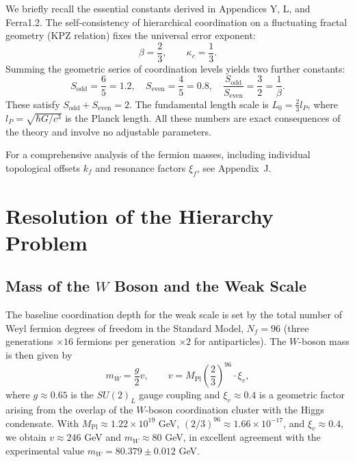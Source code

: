\documentclass[12pt,a4paper]{article}
\begin{document}
	We briefly recall the essential constants derived in Appendices Y, L, and Ferra1.2. The self‑consistency of hierarchical coordination on a fluctuating fractal geometry (KPZ relation) fixes the universal error exponent:
	\begin{equation}
		\beta = \frac{2}{3}, \qquad \kappa_c = \frac{1}{3}.
	\end{equation}
	Summing the geometric series of coordination levels yields two further constants:
	\begin{equation}
		S_{\mathrm{odd}} = \frac{6}{5} = 1.2, \quad S_{\mathrm{even}} = \frac{4}{5} = 0.8, \quad \frac{S_{\mathrm{odd}}}{S_{\mathrm{even}}} = \frac{3}{2} = \frac{1}{\beta}.
	\end{equation}
	These satisfy $S_{\mathrm{odd}} + S_{\mathrm{even}} = 2$. The fundamental length scale is $L_0 = \frac{2}{3} l_P$, where $l_P = \sqrt{\hbar G / c^3}$ is the Planck length. All these numbers are exact consequences of the theory and involve no adjustable parameters.
	
	For a comprehensive analysis of the fermion masses, including individual topological offsets $k_f$ and resonance factors $\xi_f$, see Appendix~J.
	
	\section{Resolution of the Hierarchy Problem}
	
	\subsection{Mass of the $W$ Boson and the Weak Scale}
	
	The baseline coordination depth for the weak scale is set by the total number of Weyl fermion degrees of freedom in the Standard Model, $N_f = 96$ (three generations $\times 16$ fermions per generation $\times 2$ for antiparticles). The $W$-boson mass is then given by
	\begin{equation}
		m_W = \frac{g}{2} v, \qquad v = M_{\mathrm{Pl}} \left( \frac{2}{3} \right)^{96} \cdot \xi_v,
		\label{eq:mw_yuct}
	\end{equation}
	where $g \approx 0.65$ is the $SU(2)_L$ gauge coupling and $\xi_v \approx 0.4$ is a geometric factor arising from the overlap of the $W$-boson coordination cluster with the Higgs condensate. With $M_{\mathrm{Pl}} \approx 1.22\times10^{19}$ GeV, $(2/3)^{96} \approx 1.66\times10^{-17}$, and $\xi_v \approx 0.4$, we obtain $v \approx 246$ GeV and $m_W \approx 80$ GeV, in excellent agreement with the experimental value $m_W = 80.379 \pm 0.012$ GeV.
	
\end{document}
